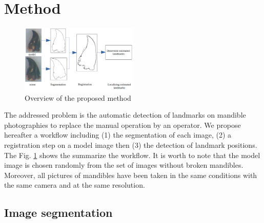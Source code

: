 \documentclass[twoside,twocolumn,10pt]{article}
\begin{document}
\section{Method}

\begin{figure}[htb]
    \centering
    \includegraphics[width=0.5\textwidth]{./images/method}
    \caption{Overview of the proposed method}
    \label{fig:method}
\end{figure}
The addressed problem is the automatic detection of landmarks on mandible photographies to replace the manual operation by an operator.
We propose hereafter a workflow including (1) the segmentation of each image, (2) a registration step on a model image then (3) the detection of landmark positions.
The Fig. \ref{fig:method} shows the summarize the workflow.
It is worth to note that the model image is chosen randomly from the set of images without broken mandibles.
Moreover, all pictures of mandibles have been taken in the same conditions with the same camera and at the same resolution.


\subsection{Image segmentation}
\end{document}
